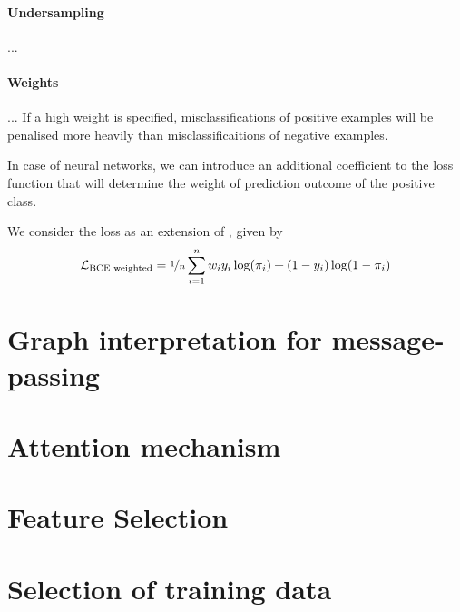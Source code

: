 \documentclass[
	fontsize=10pt, %
	twoside=false, %
	secnumdepth=1, %
]{kaobook}
\begin{document}

\paragraph{Undersampling} ...

\paragraph{Weights} ...
If a high weight is specified, misclassifications of positive
examples will be penalised more heavily than misclassificaitions of negative examples.

In case of neural networks, we can introduce an additional coefficient to the
loss function that will determine the weight of prediction outcome of the
positive class. 

We consider the  loss as
an extension of , given by
\begin{align}
  \label{eq:bce-loss-weighted}
  \mathcal{L}_{\text{BCE weighted}} = \nicefrac{1}{n} \sum_{i=1}^n w_i y_i \log(\pi_i) + (1-y_i) \log (1-\pi_i)
\end{align}

\section{Graph interpretation for message-passing}

\section{Attention mechanism}

\section{Feature Selection}

\section{Selection of training data}
\end{document}
